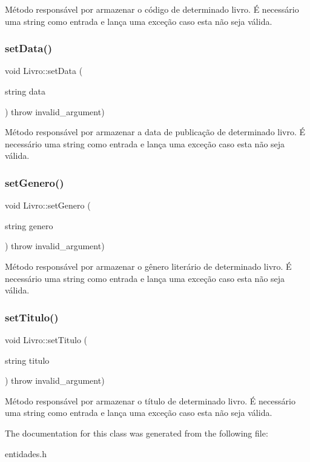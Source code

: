 Método responsável por armazenar o código de determinado livro. É necessário uma string como entrada e lança uma exceção caso esta não seja válida. \mbox{\label{classLivro_a073f7124564707c5c36e9a44448aa13a}} 
\subsubsection{\texorpdfstring{set\+Data()}{setData()}}
{\footnotesize\ttfamily void Livro\+::set\+Data (\begin{DoxyParamCaption}\item[{string}]{data }\end{DoxyParamCaption}) throw  invalid\+\_\+argument) \hspace{0.3cm}{\ttfamily [inline]}}

Método responsável por armazenar a data de publicação de determinado livro. É necessário uma string como entrada e lança uma exceção caso esta não seja válida. \mbox{\label{classLivro_a642383a02f6a1dac3f69de8ac80184e7}} 
\subsubsection{\texorpdfstring{set\+Genero()}{setGenero()}}
{\footnotesize\ttfamily void Livro\+::set\+Genero (\begin{DoxyParamCaption}\item[{string}]{genero }\end{DoxyParamCaption}) throw  invalid\+\_\+argument) \hspace{0.3cm}{\ttfamily [inline]}}

Método responsável por armazenar o gênero literário de determinado livro. É necessário uma string como entrada e lança uma exceção caso esta não seja válida. \mbox{\label{classLivro_adbae26ce6938e1f56ed6d88b458351c7}} 
\subsubsection{\texorpdfstring{set\+Titulo()}{setTitulo()}}
{\footnotesize\ttfamily void Livro\+::set\+Titulo (\begin{DoxyParamCaption}\item[{string}]{titulo }\end{DoxyParamCaption}) throw  invalid\+\_\+argument) \hspace{0.3cm}{\ttfamily [inline]}}

Método responsável por armazenar o título de determinado livro. É necessário uma string como entrada e lança uma exceção caso esta não seja válida. 

The documentation for this class was generated from the following file\+:\begin{DoxyCompactItemize}
\item 
entidades.\+h\end{DoxyCompactItemize}
